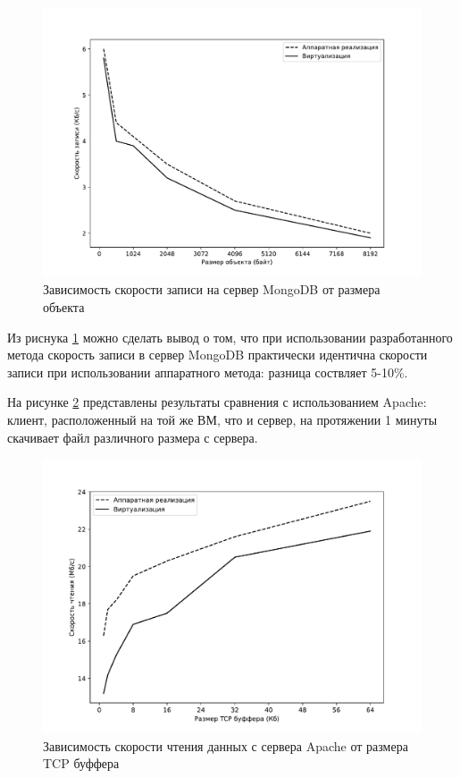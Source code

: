 \begin{figure}[h]
	\centering
	\includegraphics[width=\textwidth]{img/system-1.pdf}
	\caption{Зависимость скорости записи на сервер MongoDB от размера объекта}
	\label{fig:system-1}
\end{figure}

Из риснука \ref{fig:system-1} можно сделать вывод о том, что при использовании разработанного метода скорость записи в сервер MongoDB практически идентична скорости записи при использовании аппаратного метода: разница соствляет 5-10\%.

На рисунке \ref{fig:system-2} представлены результаты сравнения с использованием Apache: клиент, расположенный на той же ВМ, что и сервер, на протяжении 1 минуты скачивает файл различного размера с сервера.

\begin{figure}[h]
	\centering
	\includegraphics[width=\textwidth]{img/system-2.pdf}
	\caption{Зависимость скорости чтения данных с сервера Apache от размера TCP буффера}
	\label{fig:system-2}
\end{figure}

